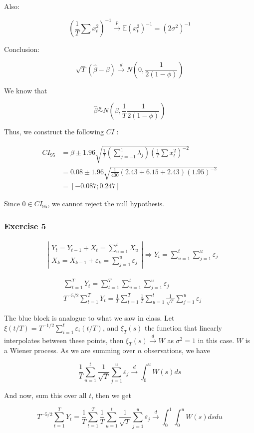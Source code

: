 {{\begin{enumerate}[label=(\alph*)]
{Also: 

$$
\left(\frac{1}{T} \sum x_{t}^{2}\right)^{-1} \xrightarrow{p} \mathbb{E}\left(x_{t}^{2}\right)^{-1}=\left(2 \sigma^{2}\right)^{-1}
$$

Conclusion: 

$$
\sqrt{T}(\hat{\beta}-\beta) \xrightarrow{d} N\left(0, \frac{1}{2(1-\phi)}\right)
$$
}
{\item 
We know that

$$
\hat{\beta} \stackrel{a}{\sim} N\left(\beta, \frac{1}{T} \frac{1}{2(1-\phi)}\right)
$$

Thus, we construct the following $C I$ :

$$
\begin{aligned}
C I_{95} & =\hat{\beta} \pm 1.96 \sqrt{\frac{1}{T}\left(\sum_{j=-1}^{1} \hat{\lambda}_{j}\right)\left(\frac{1}{T} \sum x_{t}^{2}\right)^{-2}} \\
& =0.08 \pm 1.96 \sqrt{\frac{1}{400}(2.43+6.15+2.43)(1.95)^{-2}} \\
& =[-0.087 ; 0.247]
\end{aligned}
$$

Since $0 \in C I_{95}$, we cannot reject the null hypothesis.
}
\end{enumerate}
}
{
\subsubsection*{Exercise 5}

\begin{align*}
& \left|\begin{array}{l}
Y_{t}=Y_{t-1}+X_{t}=\sum_{u=1}^{t} X_{u} \\
X_{k}=X_{k-1}+\varepsilon_{k}=\sum_{j=1}^{u} \varepsilon_{j}
\end{array}\right| \Rightarrow Y_{t}=\sum_{u=1}^{t} \sum_{j=1}^{u} \varepsilon_{j}
\end{align*}

\begin{align*}
& \sum_{t=1}^{T} Y_{t}=\sum_{t=1}^{T} \sum_{u=1}^{t} \sum_{j=1}^{u} \varepsilon_{j} \\
& T^{-5 / 2} \sum_{t=1}^{T} Y_{t}=\frac{1}{T} \sum_{t=1}^{T} \boxed{\frac{1}{T} \sum_{u=1}^{t} \frac{1}{\sqrt{T}} \sum_{j=1}^{u} \varepsilon_{j}}
\end{align*}

The blue block is analogue to what we saw in class.
Let $\xi(t / T)=T^{-1 / 2} \sum_{i=1}^{t} \varepsilon_{i}(t / T)$, and $\xi_{T}(s)$ the function that linearly interpolates between these points, then $\xi_{T}(s) \xrightarrow{d} W$ as $\sigma^{2}=1$ in this case. $W$ is a Wiener process. As we are summing over $n$ observations, we have

$$
\boxed{\frac{1}{T} \sum_{u=1}^{t} \frac{1}{\sqrt{T}} \sum_{j=1}^{u} \varepsilon_{j}} \xrightarrow{d} \int_{0}^{u} W(s) d s
$$

And now, sum this over all $t$, then we get

$$
T^{-5 / 2} \sum_{t=1}^{T} Y_{t}=\frac{1}{T} \sum_{t=1}^{T} \frac{1}{T} \sum_{u=1}^{t} \frac{1}{\sqrt{T}} \sum_{j=1}^{u} \varepsilon_{j} \xrightarrow{d} \int_{0}^{1} \int_{0}^{u} W(s) d s d u
$$
}
}
